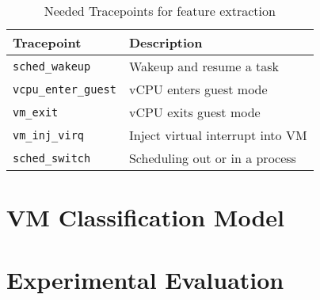 \documentclass[10pt, conference, compsocconf]{IEEEtran}
\begin{document}
\begin{table}
\caption{Needed Tracepoints for feature extraction}
\centering
\begin{tabular}{p{2.5cm}p{5.8cm}}
  \hline
  \rowcolor{Gray}
  \footnotesize \textbf{Tracepoint} & \footnotesize \textbf{Description} \\
  \hline
  \hline
  
  \footnotesize \texttt{sched\_wakeup}  & \footnotesize Wakeup and resume a task \\
  \footnotesize \texttt{vcpu\_enter\_guest}  & \footnotesize vCPU enters guest mode \\
  \footnotesize \texttt{vm\_exit}  & \footnotesize vCPU exits guest mode \\
  \footnotesize \texttt{vm\_inj\_virq}  & \footnotesize Inject virtual interrupt into VM \\
  \footnotesize \texttt{sched\_switch}  & \footnotesize  Scheduling out or in a process\\
    \hline
\end{tabular}
\label{tab:agent-base-tracepoints}
\end{table}

\section{VM Classification Model}


\section{Experimental Evaluation}
\end{document}
